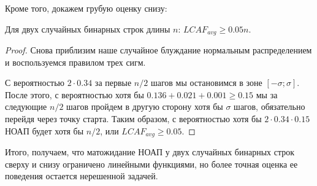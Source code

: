 Кроме того, докажем грубую оценку снизу:
\begin{theorem}
Для двух случайных бинарных строк длины $n$: $LCAF_{avg} \ge 0.05n$.
\end{theorem}
\begin{proof}
Снова приблизим наше случайное блуждание нормальным распределением и воспользуемся правилом трех сигм.

С вероятностью $2 \cdot 0.34$ за первые $n/2$ шагов мы остановимся в зоне $[-\sigma; \sigma]$. После этого, с вероятностью хотя бы $0.136+0.021+0.001 \ge 0.15$ мы за следующие $n/2$ шагов пройдем в другую сторону хотя бы $\sigma$ шагов, обязательно перейдя через точку старта. Таким образом, с вероятностью хотя бы $2 \cdot 0.34 \cdot 0.15$ НОАП будет хотя бы $n/2$, или $LCAF_{avg} \ge 0.05$. %

\end{proof}

Итого, получаем, что матожидание НОАП у двух случайных бинарных строк сверху и снизу ограничено линейными функциями, но более точная оценка ее поведения остается нерешенной задачей.

